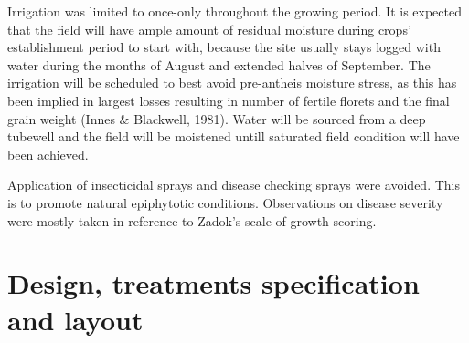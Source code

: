 \documentclass[12pt,oneside]{dukestatscithesis} %
\theoremstyle{definition}
\theoremstyle{definition}
\theoremstyle{definition}
\theoremstyle{remark}
\begin{document}
Irrigation was limited to once-only throughout the growing period. It is
expected that the field will have ample amount of residual moisture
during crops' establishment period to start with, because the site
usually stays logged with water during the months of August and extended
halves of September. The irrigation will be scheduled to best avoid
pre-antheis moisture stress, as this has been implied in largest losses
resulting in number of fertile florets and the final grain weight (Innes
\& Blackwell, 1981). Water will be sourced from a deep tubewell and the
field will be moistened untill saturated field condition will have been
achieved.

Application of insecticidal sprays and disease checking sprays were
avoided. This is to promote natural epiphytotic conditions. Observations
on disease severity were mostly taken in reference to Zadok's scale of
growth scoring.

\section{Design, treatments specification and
layout}\label{design-treatments-specification-and-layout}
\end{document}
